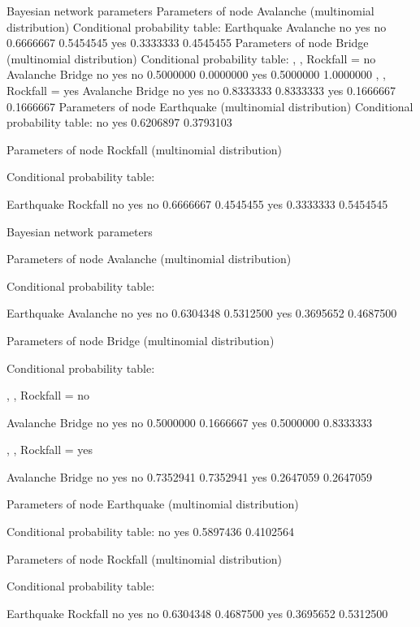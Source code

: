 Bayesian network parameters
  Parameters of node Avalanche (multinomial distribution)
Conditional probability table:
         Earthquake
Avalanche        no       yes
      no  0.6666667 0.5454545
      yes 0.3333333 0.4545455
  Parameters of node Bridge (multinomial distribution)
Conditional probability table:
, , Rockfall = no
      Avalanche
Bridge        no       yes
   no  0.5000000 0.0000000
   yes 0.5000000 1.0000000
, , Rockfall = yes
      Avalanche
Bridge        no       yes
   no  0.8333333 0.8333333
   yes 0.1666667 0.1666667
  Parameters of node Earthquake (multinomial distribution)
Conditional probability table:
        no       yes 
0.6206897 0.3793103 

  Parameters of node Rockfall (multinomial distribution)

Conditional probability table:
 
        Earthquake
Rockfall        no       yes
     no  0.6666667 0.4545455
     yes 0.3333333 0.5454545


  Bayesian network parameters

  Parameters of node Avalanche (multinomial distribution)

Conditional probability table:
 
         Earthquake
Avalanche        no       yes
      no  0.6304348 0.5312500
      yes 0.3695652 0.4687500

  Parameters of node Bridge (multinomial distribution)

Conditional probability table:
 
, , Rockfall = no

      Avalanche
Bridge        no       yes
   no  0.5000000 0.1666667
   yes 0.5000000 0.8333333

, , Rockfall = yes

      Avalanche
Bridge        no       yes
   no  0.7352941 0.7352941
   yes 0.2647059 0.2647059


  Parameters of node Earthquake (multinomial distribution)

Conditional probability table:
        no       yes 
0.5897436 0.4102564 

  Parameters of node Rockfall (multinomial distribution)

Conditional probability table:
 
        Earthquake
Rockfall        no       yes
     no  0.6304348 0.4687500
     yes 0.3695652 0.5312500